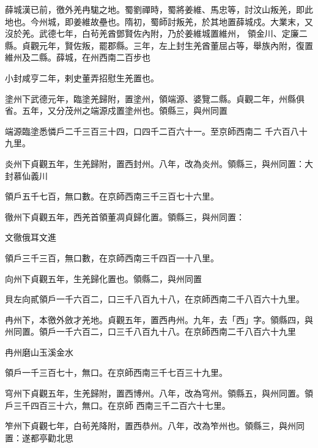 \begin{pinyinscope}
 薛城漢已前，徼外羌冉駹之地。蜀劉禪時，蜀將姜維、馬忠等，討汶山叛羌，即此地也。今州城，即姜維故壘也。隋初，蜀師討叛羌，於其地置薛城戍。大業末，又沒於羌。武德七年，白茍羌酋鄧賢佐內附，乃於姜維城置維州，
 領金川、定廉二縣。貞觀元年，賢佐叛，罷郡縣。三年，左上封生羌酋董屈占等，舉族內附，復置維州及二縣。薛城，在州西南二百步也



 小封咸亨二年，剌史董弄招慰生羌置也。



 塗州下武德元年，臨塗羌歸附，置塗州，領端源、婆覽二縣。貞觀二年，州縣俱省。五年，又分茂州之端源戍置塗州也。領縣三，與州同置



 端源臨塗悉憐戶二千三百三十四，口四千二百六十一。至京師西南二
 千六百八十九里。



 炎州下貞觀五年，生羌歸附，置西封州。八年，改為炎州。領縣三，與州同置：大封慕仙義川



 領戶五千七百，無口數。在京師西南三千三百七十六里。



 徹州下貞觀五年，西羌首領董凋貞歸化置。領縣三，與州同置：



 文徹俄耳文進



 領戶三千三百，無口數，在京師西南三千四百一十八里。



 向州下貞觀五年，生羌歸化置也。領縣二，與州同置



 貝左向貳領戶一千六百二，口三千八百九十八，在京師西南二千八百六十九里。



 冉州下，本徼外斂才羌地。貞觀五年，置西冉州。九年，去「西」字。領縣四，與州同置。領戶一千六百二，口三千八百九十八。在京師西南二千八百六十九里



 冉州磨山玉溪金水



 領戶一千三百七十，無口。在京師西南三千七百三十九里。



 穹州下貞觀五年，生羌歸附，置西博州。八年，改為穹州。領縣五，與州同置。領戶三千四百三十六，無口。在京師
 西南三千二百六十七里。



 笮州下貞觀七年，白茍羌降附，置西恭州。八年，改為笮州也。領縣三，與州同置：遂都亭勸北思




\end{pinyinscope}
